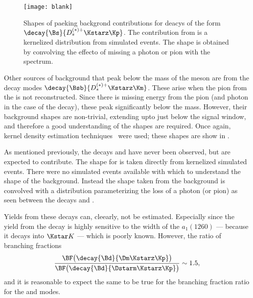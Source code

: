 \begin{figure}
  \begin{center}
    \texttt{[image: blank]}
    \caption{\small
      Shapes of paeking backgrond contributions for
      deacys of the form $\decay{\Bs}{D_s^{(*)+}\Kstarz\Kp}$.
      The contribution from \bstodskstrk is a kernelized distribution from
      simulated events.
      The \bstodsstrkstrk shape is obtained by convolving the
      effecto of missing a photon or pion with the \bstodskstrk spectrum.
    }
    \label{fig:dsphi:bkgshape}
  \end{center}
\end{figure}






Other sources of background that peak below the mass of the \Bp meson are from the decay modes
$\decay{\Bsb}{D_s^{(*)+}\Kstarz\Km}$.
These arise when the pion from the \decay{\Kstarz}{\Kp\pim} is not reconstructed.
Since there is missing energy from the pion (and photon in the case of the \Dssp decay), these peak
significantly below the \Bp mass.
However, their background shapes are non-trivial, extending upto just below the signal window,
and therefore a good understanding of the shapes are required.
Once again, kernel density estimation techniques~\cite{Cranmer:2000du} were used; these shapes are
show in .

As mentioned previously, the decays \bstodskstrk and \bstodsstrkstrk have never been observed, but
are expected to contribute.
The shape for \bstodskstrk is taken directly from kernelized simulated events.
There were no simulated events available with which to understand the shape of the \bstodsstrkstrk
background.
Instead the shape taken from the \bstodskstrk background is convolved with a distribution
parameterizing the loss of a photon (or pion) as seen between the decays \btodsstrphi and
\bstodskstrk.

Yields from these decays can, cleearly, not be estimated.
Especially since the yield from the decay \bstodskstrk is highly sensitive to the width of the
$a_1(1260)$ --- because it decays into $\Kstar K$ --- which is poorly known.
However, the ratio of branching fractions
\begin{equation}
  \frac{\BF\big(\decay{\Bd}{\Dm\Kstarz\Kp}\big)}
  {\BF\big(\decay{\Bd}{\Dstarm\Kstarz\Kp}\big)}
  \sim 1.5,
\end{equation}
and it is reasonable to expect the same to be true for the branching fraction ratio for the
\bstodskstrk and \bstodsstrkstrk modes.



